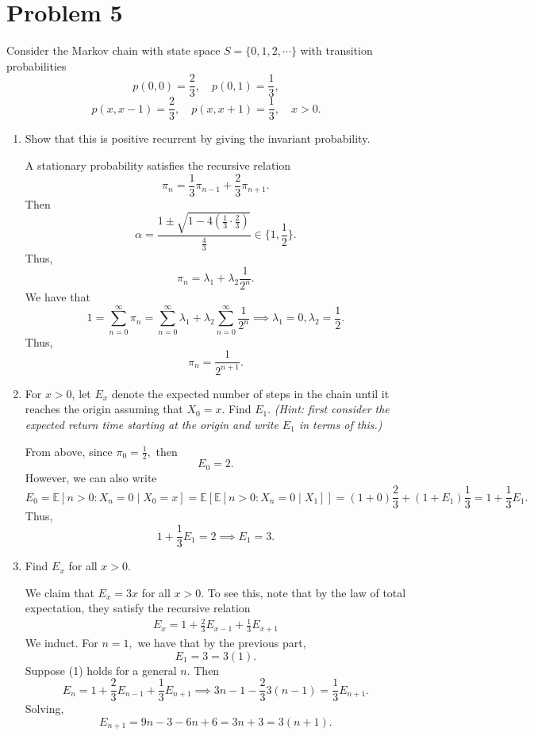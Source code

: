 \documentclass[11pt]{article}
\newcommand{\bbE}{\mathbb{E}}
\begin{document}
\newpage

\section*{Problem 5}
Consider the Markov chain with state space \(S=\{0,1,2,\cdots\}\) with transition probabilities
\[
p(0,0)=\frac{2}{3},\quad p(0,1)=\frac{1}{3},
\]
\[
p(x,x-1)=\frac{2}{3},\quad p(x,x+1)=\frac{1}{3},\quad x>0.
\]

\begin{enumerate}[label=(\alph*)]
    \item Show that this is positive recurrent by giving the invariant probability.
    \begin{solution}
A stationary probability satisfies the recursive relation
\[\pi_n = \frac{1}{3}\pi_{n-1} + \frac{2}{3}\pi_{n+1}.\] Then 
\[\alpha = \frac{1\pm \sqrt{1 - 4(\frac{1}{3}\cdot\frac{2}{3})}}{\frac{4}{3}} \in \{1, \frac{1}{2}\}.\]
Thus, 
\[\pi_n = \lambda_1 + \lambda_2\frac{1}{2^n}.\] We have that 
\[1 = \sum_{n=0}^\infty \pi_n = \sum_{n=0}^\infty \lambda_1 + \lambda_2\sum_{n=0}^\infty \frac{1}{2^n}\implies \lambda_1 = 0, \lambda_2 = \frac{1}{2}.\] Thus, 
\[\boxed{\pi_n = \frac{1}{2^{n+1}}}.\]
    \end{solution}
    
    \item For \(x>0\), let \(E_{x}\) denote the expected number of steps in the chain until it reaches the origin assuming that \(X_{0}=x\). Find \(E_{1}\). \textit{(Hint: first consider the expected return time starting at the origin and write \(E_{1}\) in terms of this.)}
\begin{solution}
    From above, since $\pi_0 = \frac{1}{2},$ then 
    \[E_0 = 2.\] However, we can also write 
    \[E_0 = \bbE[n >0: X_n = 0 \mid X_0 = x] = \bbE[\bbE[n>0 : X_n = 0 \mid X_1]] = (1 + 0)\frac{2}{3} + (1 + E_1)\frac{1}{3} = 1 + \frac{1}{3}E_1.\] Thus, 
    \[1 + \frac{1}{3}E_1 = 2 \implies \boxed{E_1 = 3}.\]
\end{solution}
    
    \item Find \(E_{x}\) for all \(x>0\).
\begin{solution}
We claim that $\boxed{E_x = 3x}$ for all $x>0.$ To see this, note that by the law of total expectation, they satisfy the recursive relation
\begin{align}
E_x = 1 + \frac{2}{3}E_{x-1} + \frac{1}{3}E_{x+1}    
\end{align} We induct. 
For $n= 1,$ we have that by the previous part,
\[E_1= 3 = 3(1).\] Suppose (1) holds for a general $n.$ Then 
\[E_{n} = 1 + \frac{2}{3} E_{n-1} + \frac{1}{3}E_{n+1} \implies 3n -1 - \frac{2}{3}3(n-1) = \frac{1}{3}E_{n+1}.\]
Solving, 
\[E_{n+1} = 9n - 3 - 6n +6 = 3n + 3 =3(n+1).\]
\end{solution}
    

\end{enumerate}
\end{document}
